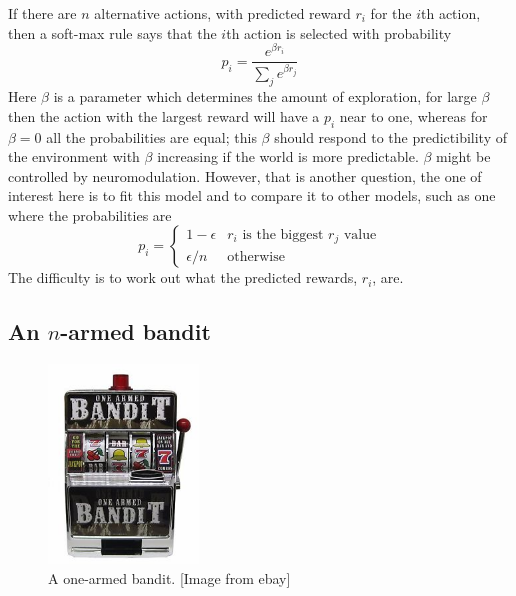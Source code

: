 \documentclass[12pt]{article}
\begin{document}
If there are $n$ alternative actions, with predicted reward $r_i$ for
the $i$th action, then a soft-max rule says that the $i$th action is
selected with probability
\begin{equation}
p_i=\frac{e^{\beta r_i}}{\sum_j e^{\beta r_j}}
\end{equation}
Here $\beta$ is a parameter which determines the amount of
exploration, for large $\beta$ then the action with the largest reward
will have a $p_i$ near to one, whereas for $\beta=0$ all the
probabilities are equal; this $\beta$ should respond to the
predictibility of the environment with $\beta$ increasing if the world
is more predictable. $\beta$ might be controlled by
neuromodulation. However, that is another question, the one of
interest here is to fit this model and to compare it to other models, such as one where the probabilities are
\begin{equation}
p_i=\left\{\begin{array}{ll}1-\epsilon&r_i\mbox{ is the biggest }r_j\mbox{ value}\\\epsilon/n&\mbox{otherwise}\end{array}\right.
\end{equation}
The difficulty is to work out what the predicted rewards, $r_i$, are.

\subsection*{An $n$-armed bandit}

\begin{figure}[htb]
\begin{center}
\includegraphics[width=4cm]{fig_one_armed.jpg}
\end{center}
\caption{A one-armed bandit. [Image from ebay]\label{fig_one_armed}}
\end{figure}
\end{document}
